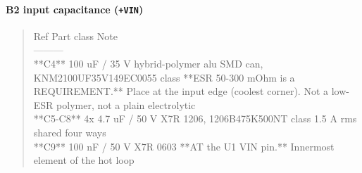 \documentclass[11pt,a4paper]{article}
\begin{document}
\paragraph*{B2 input capacitance (\texttt{+VIN})}
\begin{quote}\small\ttfamily\raggedright
\textbar{} Ref \textbar{} Part class \textbar{} Note \textbar{}\\
\textbar{}---\textbar{}---\textbar{}---\textbar{}\\
\textbar{} {*}{*}C4{*}{*} \textbar{} 100 uF / 35 V hybrid-polymer alu SMD can, KNM2100UF35V149EC0055 class \textbar{} {*}{*}ESR 50-300 mOhm is a REQUIREMENT.{*}{*} Place at the input edge (coolest corner). Not a low-ESR polymer, not a plain electrolytic \textbar{}\\
\textbar{} {*}{*}C5-C8{*}{*} \textbar{} 4x 4.7 uF / 50 V X7R 1206, 1206B475K500NT class \textbar{} 1.5 A rms shared four ways \textbar{}\\
\textbar{} {*}{*}C9{*}{*} \textbar{} 100 nF / 50 V X7R 0603 \textbar{} {*}{*}AT the U1 VIN pin.{*}{*} Innermost element of the hot loop \textbar{}
\end{quote}
\end{document}
